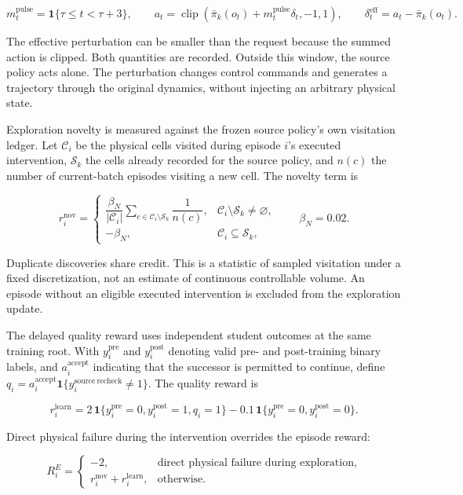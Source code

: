 \documentclass[
  american,
  11pt,
  a4paper,
]{article}
\begin{document}
\[
m_t^{\mathrm{pulse}}=\mathbf1\{\tau\le t<\tau+3\},\qquad
a_t=\operatorname{clip}\!\left(\bar\pi_k(o_t)+m_t^{\mathrm{pulse}}\delta_t,-1,1\right),
\qquad
\delta_t^{\mathrm{eff}}=a_t-\bar\pi_k(o_t).
\tag{10}\label{eq:10}
\]

The effective perturbation can be smaller than the request because the
summed action is clipped. Both quantities are recorded. Outside this
window, the source policy acts alone. The perturbation changes control
commands and generates a trajectory through the original dynamics,
without injecting an arbitrary physical state.

Exploration novelty is measured against the frozen source policy's own
visitation ledger. Let \(\mathcal C_i\) be the physical cells visited
during episode \(i\)'s executed intervention, \(\mathcal S_k\) the cells
already recorded for the source policy, and \(n(c)\) the number of
current-batch episodes visiting a new cell. The novelty term is

\[
r_i^{\mathrm{nov}}=
\begin{cases}
\dfrac{\beta_N}{|\mathcal C_i|}
\displaystyle\sum_{c\in\mathcal C_i\setminus\mathcal S_k}\dfrac{1}{n(c)},
&\mathcal C_i\setminus\mathcal S_k\ne\varnothing,\\
-\beta_N,&\mathcal C_i\subseteq\mathcal S_k,
\end{cases}
\qquad \beta_N=0.02.
\tag{11}\label{eq:11}
\]

Duplicate discoveries share credit. This is a statistic of sampled
visitation under a fixed discretization, not an estimate of continuous
controllable volume. An episode without an eligible executed
intervention is excluded from the exploration update.

The delayed quality reward uses independent student outcomes at the same
training root. With \(y_i^{\mathrm{pre}}\) and \(y_i^{\mathrm{post}}\)
denoting valid pre- and post-training binary labels, and
\(a_i^{\mathrm{accept}}\) indicating that the successor is permitted to
continue, define
\(q_i=a_i^{\mathrm{accept}}\mathbf1\{y_i^{\mathrm{source\ recheck}}\ne1\}\).
The quality reward is

\[
r_i^{\mathrm{learn}}=
2\,\mathbf1\{y_i^{\mathrm{pre}}=0,y_i^{\mathrm{post}}=1,q_i=1\}
-0.1\,\mathbf1\{y_i^{\mathrm{pre}}=0,y_i^{\mathrm{post}}=0\}.
\tag{12}\label{eq:12}
\]

Direct physical failure during the intervention overrides the episode
reward:

\[
R_i^E=
\begin{cases}
-2,&\text{direct physical failure during exploration},\\
r_i^{\mathrm{nov}}+r_i^{\mathrm{learn}},&\text{otherwise}.
\end{cases}
\tag{13}\label{eq:13}
\]
\end{document}
